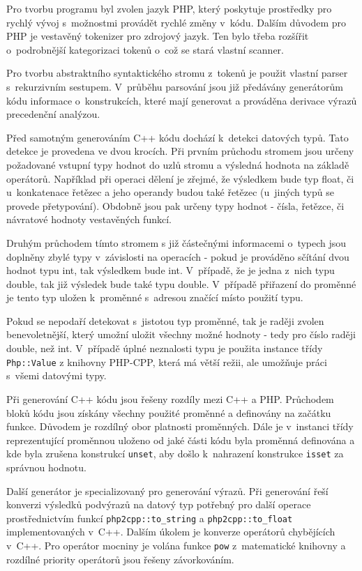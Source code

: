 \documentclass[czech]{ExcelAtFIT}
\newcommand{\function}[1]{\texttt{#1}}
\begin{document}
	Pro tvorbu programu byl zvolen jazyk PHP, který poskytuje prostředky pro rychlý vývoj s~možnostmi provádět rychlé změny v~kódu. Dalším důvodem pro PHP je vestavěný tokenizer pro zdrojový jazyk. Ten bylo třeba rozšířit o~podrobnější kategorizaci tokenů o~což se stará vlastní scanner.

	Pro tvorbu abstraktního syntaktického stromu z~tokenů je použit vlastní parser s~rekurzivním sestupem. V~průběhu parsování jsou již předávány generátorům kódu informace o~konstrukcích, které mají generovat a prováděna derivace výrazů precedenční analýzou.

	Před samotným generováním C++ kódu dochází k~detekci datových typů. Tato detekce je provedena ve dvou krocích. Při prvním průchodu stromem jsou určeny požadované vstupní typy hodnot do uzlů stromu a výsledná hodnota na základě operátorů. Například při operaci dělení je zřejmé, že výsledkem bude typ float, či u~konkatenace řetězec a jeho operandy budou také řetězec (u~jiných typů se provede přetypování). Obdobně jsou pak určeny typy hodnot - čísla, řetězce, či návratové hodnoty vestavěných funkcí.

	Druhým průchodem tímto stromem s již částečnými informacemi o~typech jsou doplněny zbylé typy v~závislosti na operacích - pokud je prováděno sčítání dvou hodnot typu int, tak výsledkem bude int. V~případě, že je jedna z~nich typu double, tak již výsledek bude také typu double. V~případě přiřazení do proměnné je tento typ uložen k~proměnné s~adresou značící místo použití typu.

	Pokud se nepodaří detekovat s~jistotou typ proměnné, tak je raději zvolen benevoletnější, který umožní uložit všechny možné hodnoty - tedy pro číslo raději double, než int. V~případě úplné neznalosti typu je použita instance třídy \function{Php::Value} z knihovny PHP-CPP, která má větší režii, ale umožňuje práci s~všemi datovými typy.

	Při generování C++ kódu jsou řešeny rozdíly mezi C++ a PHP. Průchodem bloků kódu jsou získány všechny použité proměnné a definovány na začátku funkce. Důvodem je rozdílný obor platnosti proměnných. Dále je v~instanci třídy reprezentující proměnnou uloženo od jaké části kódu byla proměnná definována a kde byla zrušena konstrukcí \function{unset}, aby došlo k~nahrazení konstrukce \function{isset} za správnou hodnotu.

	Další generátor je specializovaný pro generování výrazů. Při generování řeší konverzi výsledků podvýrazů na datový typ potřebný pro další operace prostřednictvím funkcí \function{php2cpp::to\_string} a \function{php2cpp::to\_float} implementovaných v~C++. Dalším úkolem je konverze operátorů chybějících v~C++. Pro operátor mocniny je volána funkce \function{pow} z~matematické knihovny a rozdílné priority operátorů jsou řešeny závorkováním.
\end{document}
